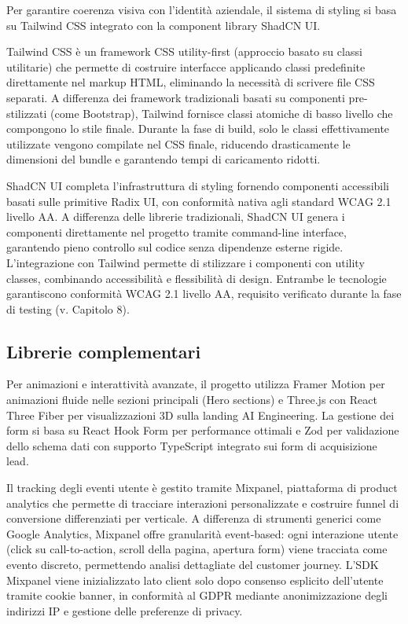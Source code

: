 Per garantire coerenza visiva con l'identità aziendale, il sistema di styling 
si basa su Tailwind CSS integrato con la component library ShadCN UI.

Tailwind CSS è un framework CSS utility-first (approccio basato su classi 
utilitarie) che permette di costruire interfacce applicando classi predefinite 
direttamente nel markup HTML, eliminando la necessità di scrivere file CSS 
separati. A differenza dei framework tradizionali basati su componenti 
pre-stilizzati (come Bootstrap), Tailwind fornisce classi atomiche di basso 
livello che compongono lo stile finale. Durante la fase di build, solo le 
classi effettivamente utilizzate vengono compilate nel CSS finale, riducendo 
drasticamente le dimensioni del bundle e garantendo tempi di caricamento ridotti.

ShadCN UI completa l'infrastruttura di styling fornendo componenti accessibili 
basati sulle primitive Radix UI, con conformità nativa agli standard WCAG 2.1 
livello AA. A differenza delle librerie tradizionali, ShadCN UI genera i 
componenti direttamente nel progetto tramite command-line interface, garantendo 
pieno controllo sul codice senza dipendenze esterne rigide. L'integrazione con 
Tailwind permette di stilizzare i componenti con utility classes, combinando 
accessibilità e flessibilità di design. Entrambe le tecnologie garantiscono 
conformità WCAG 2.1 livello AA, requisito verificato durante la fase di 
testing (v. Capitolo 8).

\subsection{Librerie complementari}

Per animazioni e interattività avanzate, il progetto utilizza Framer Motion per 
animazioni fluide nelle sezioni principali (Hero sections) e Three.js con React 
Three Fiber per visualizzazioni 3D sulla landing AI Engineering. La gestione dei 
form si basa su React Hook Form per performance ottimali e Zod per validazione 
dello schema dati con supporto TypeScript integrato sui form di acquisizione lead.

Il tracking degli eventi utente è gestito tramite Mixpanel, piattaforma di 
product analytics che permette di tracciare interazioni personalizzate e 
costruire funnel di conversione differenziati per verticale. A differenza di 
strumenti generici come Google Analytics, Mixpanel offre granularità event-based: 
ogni interazione utente (click su call-to-action, scroll della pagina, apertura 
form) viene tracciata come evento discreto, permettendo analisi dettagliate del 
customer journey. L'SDK Mixpanel viene inizializzato lato client solo dopo 
consenso esplicito dell'utente tramite cookie banner, in conformità al GDPR 
mediante anonimizzazione degli indirizzi IP e gestione delle preferenze di 
privacy.

